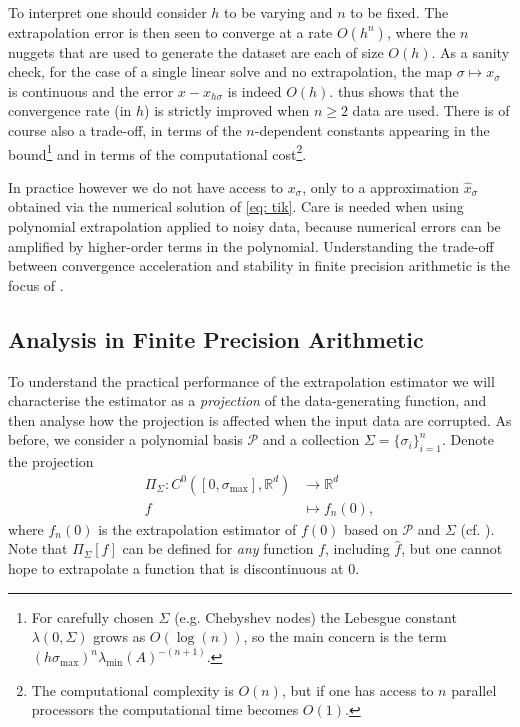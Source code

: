 \documentclass[10pt]{article} %
\newcommand{\nugget}{\sigma}
\newcommand{\nuggets}{\Sigma}
\begin{document}
\noindent To interpret  one should consider $h$ to be varying and $n$ to be fixed.
The extrapolation error is then seen to converge at a rate $O(h^n)$, where the $n$ nuggets that are used to generate the dataset are each of size $O(h)$.
As a sanity check, for the case of a single linear solve and no extrapolation, the map $\nugget \mapsto x_\nugget$ is continuous and the error $x - x_{h\nugget}$ is indeed $O(h)$.
 thus shows that the convergence rate (in $h$) is strictly improved when $n \geq 2$ data are used.
There is of course also a trade-off, in terms of the $n$-dependent constants appearing in the bound\footnote{For carefully chosen $\nuggets$ (e.g. Chebyshev nodes) the Lebesgue constant $\lambda(0,\nuggets)$ grows as $O(\log(n))$, so the main concern is the term $(h \nugget_{\max})^n \lambda_{\min}(A)^{-(n+1)}$.} and in terms of the computational cost\footnote{The computational complexity is $O(n)$, but if one has access to $n$ parallel processors the computational time becomes $O(1)$.}.

In practice however we do not have access to $x_\nugget$, only to a approximation $\hat{x}_\nugget$ obtained via the numerical solution of \eqref{eq: tik}.
Care is needed when using polynomial extrapolation applied to noisy data, because numerical errors can be amplified by higher-order terms in the polynomial.
Understanding the trade-off between convergence acceleration and stability in finite precision arithmetic is the focus of .



\subsection{Analysis in Finite Precision Arithmetic}
\label{subsec: select lambda}

To understand the practical performance of the extrapolation estimator we will characterise the estimator as a \emph{projection} of the data-generating function, and then analyse how the projection is affected when the input data are corrupted.
As before, we consider a polynomial basis $\mathcal{P}$ and a collection $\nuggets = \{\nugget_i\}_{i=1}^n$.
Denote the projection
\begin{align*}
\Pi_\nuggets : C^0([0,\nugget_{\max}],\mathbb{R}^d) & \rightarrow \mathbb{R}^d \\
f & \mapsto f_n(0) ,
\end{align*}
where $f_n(0)$ is the extrapolation estimator of $f(0)$ based on $\mathcal{P}$ and $\nuggets$ (cf. ).
Note that $\Pi_\nuggets[f]$ can be defined for \emph{any} function $f$, including $\hat{f}$, but one cannot hope to extrapolate a function that is discontinuous at $0$.
\end{document}
